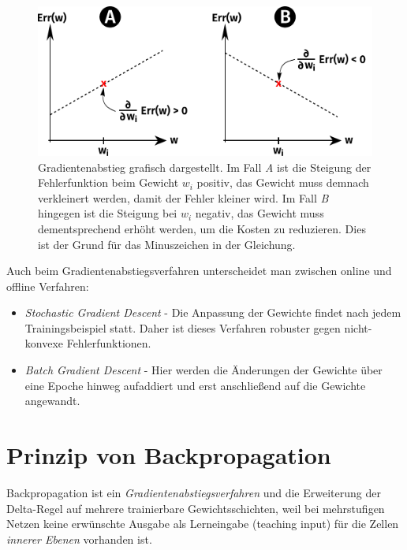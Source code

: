 \begin{figure}[ht!] \centering 
	\includegraphics[width=\linewidth]{figures/ch03_gradient-decent.pdf}
	\caption{Gradientenabstieg grafisch dargestellt. Im Fall \emph{A} ist die Steigung der Fehlerfunktion beim Gewicht $w_i$ positiv, das Gewicht muss demnach verkleinert werden, damit der Fehler kleiner wird. Im Fall \emph{B} hingegen ist die Steigung bei $w_i$ negativ, das Gewicht muss dementsprechend erhöht werden, um die Kosten zu reduzieren. Dies ist der Grund für das Minuszeichen in der Gleichung.}
	\label{fig:ch03_fehlerflaeche}
\end{figure}

Auch beim Gradientenabstiegsverfahren unterscheidet man zwischen online und offline Verfahren: 
\begin{itemize}
	\item \emph{Stochastic Gradient Descent} - Die Anpassung der Gewichte findet nach jedem Trainingsbeispiel statt. Daher ist dieses Verfahren robuster gegen nicht-konvexe Fehlerfunktionen. 
	\item \emph{Batch Gradient Descent} - Hier werden die Änderungen der Gewichte über eine Epoche hinweg aufaddiert und erst anschließend auf die Gewichte angewandt.
\end{itemize}



\section*{Prinzip von Backpropagation}
Backpropagation ist ein \emph{Gradientenabstiegsverfahren} und die Erweiterung der Delta-Regel auf mehrere trainierbare Gewichtsschichten, weil bei mehrstufigen Netzen keine erwünschte Ausgabe als Lerneingabe (teaching input) für die Zellen \emph{innerer Ebenen} vorhanden ist.


